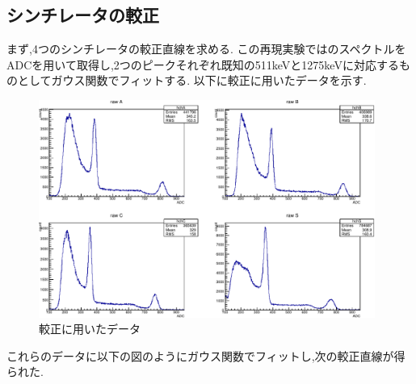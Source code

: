 \subsection{シンチレータの較正}
まず,4つのシンチレータの較正直線を求める.
この再現実験ではのスペクトルをADCを用いて取得し,2つのピークそれぞれ既知の511keVと1275keVに対応するものとしてガウス関数でフィットする.
以下に較正に用いたデータを示す.
\begin{figure}[H]
	\begin{center}
		\includegraphics[width=11cm]{fig/isb/cal7001.pdf}
		\caption{較正に用いたデータ}
		\label{fig:calibration_raw_data}
	\end{center}
\end{figure}
これらのデータに以下の図のようにガウス関数でフィットし,次の較正直線が得られた.

